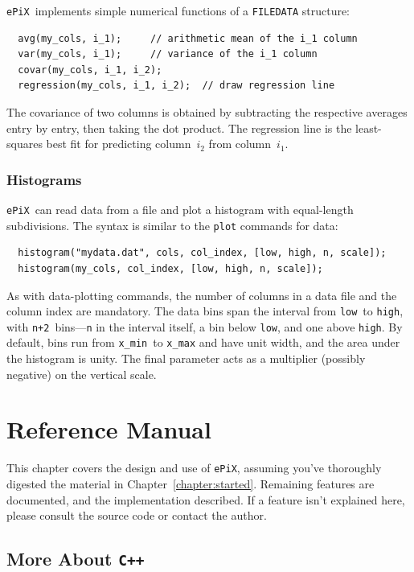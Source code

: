 \documentclass[12pt]{report}
\newcommand{\code}[1]{\texttt{#1}}
\newcommand{\ePiX}{\code{ePiX}}
\newcommand{\CXX}{\code{C++}}
\begin{document}
\ePiX\ implements simple numerical functions of a \code{FILEDATA}
structure:
\begin{verbatim}
  avg(my_cols, i_1);     // arithmetic mean of the i_1 column
  var(my_cols, i_1);     // variance of the i_1 column
  covar(my_cols, i_1, i_2); 
  regression(my_cols, i_1, i_2);  // draw regression line
\end{verbatim}
The covariance of two columns is obtained by subtracting the
respective averages entry by entry, then taking the dot product. The
regression line is the least-squares best fit for predicting
column~$i_2$ from column~$i_1$.


\subsection*{Histograms}

 \ePiX\ can read data from a file and plot a
histogram with equal-length subdivisions. The syntax is similar to the
\code{plot} commands for data:
\begin{verbatim}
  histogram("mydata.dat", cols, col_index, [low, high, n, scale]);
  histogram(my_cols, col_index, [low, high, n, scale]);
\end{verbatim}
As with data-plotting commands, the number of columns in a data file
and the column index are mandatory. The data bins span the interval
from \code{low}~to \code{high}, with \code{n+2}~bins---\code{n} in the
interval itself, a bin below \code{low}, and one above \code{high}. By
default, bins run from \verb+x_min+~to \verb+x_max+ and have unit
width, and the area under the histogram is unity. The final parameter
acts as a multiplier (possibly negative) on the vertical scale.


\chapter{Reference Manual}
\label{chapter:ref-man}

This chapter covers the design and use of \ePiX, assuming you've
thoroughly digested the material in Chapter~\ref{chapter:started}.
Remaining features are documented, and the implementation described.
If a feature isn't explained here, please consult the source code or
contact the author.


\section{More About \CXX}
\end{document}

